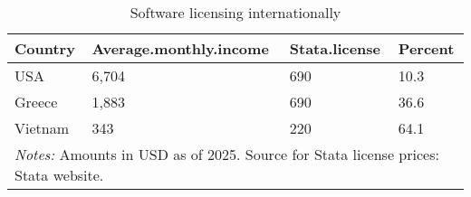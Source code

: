 \begin{table}[h]
\centering
\caption{Software licensing internationally} 
\begin{tabular}{llll}
  \toprule
Country & Average.monthly.income & Stata.license & Percent \\ 
  \midrule
USA & 6,704 & 690 & 10.3 \\ 
  Greece & 1,883 & 690 & 36.6 \\ 
  Vietnam & 343 & 220 & 64.1 \\ 
   \midrule \multicolumn{4}{l}{\textit{Notes:} Amounts in USD as of 2025. Source for Stata license prices: Stata website.} 
 \bottomrule
\end{tabular}
\end{table}
